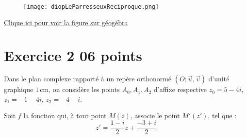 \documentclass[12pt,a4paper]{article}
\begin{document}
\begin{center}
        \begin{figure}[H]%
         \centering
         \texttt{[image: diopLeParresseuxReciproque.png]}
        \end{figure}
    \end{center}
        \href{https://www.geogebra.org/classic/efgm6ucx}{Clique ici pour voir la figure sur géogébra}

\section*{Exercice 2 \hfill 06 points}

Dans le plan complexe rapporté à un repère orthonormé \( (O ; \vec{u}, \vec{v}) \) d’unité graphique \( 1\,\text{cm} \), on considère les points \( A_0, A_1, A_2 \) d’affixe respective \( z_0 = 5 - 4i \), \( z_1 = -1 - 4i \), \( z_2 = -4 - i \).

Soit \( f \) la fonction qui, à tout point \( M(z) \), associe le point \( M'(z') \), tel que :
\[
z' = \frac{1 - i}{2} z + \frac{-3 + i}{2}
\]
\end{document}
